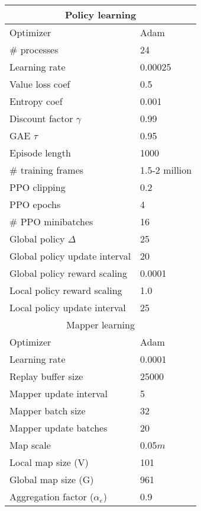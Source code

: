 \documentclass[runningheads]{llncs}
\begin{document}
\begin{table}[ht!]
\centering
\begin{tabular}{@{}ll@{}}
\toprule
\multicolumn{2}{c}{Policy learning}                             \\ \midrule
Optimizer                          & Adam~\cite{kingma2014adam} \\
$\#$ processes                     & 24                         \\
Learning rate                      & 0.00025                    \\
Value loss coef                    & 0.5                        \\
Entropy coef                       & 0.001                      \\
Discount factor $\gamma$           & 0.99                       \\
GAE $\tau$                         & 0.95                       \\
Episode length                     & 1000                       \\
$\#$ training frames               & 1.5-2 million              \\
PPO clipping                       & 0.2                        \\
PPO epochs                         & 4                          \\
$\#$ PPO minibatches               & 16                         \\
Global policy $\Delta$             & 25                         \\
Global policy update interval      & 20                         \\
Global policy reward scaling       & 0.0001                     \\
Local  policy reward scaling       & 1.0                        \\
Local policy update interval       & 25                         \\
\midrule
\multicolumn{2}{c}{Mapper learning}                             \\ \midrule
Optimizer                          & Adam~\cite{kingma2014adam} \\
Learning rate                      & 0.0001                     \\
Replay buffer size                 & 25000                      \\
Mapper update interval             & 5                          \\
Mapper batch size                  & 32                         \\
Mapper update batches              & 20                         \\
Map scale                          & 0.05$\si{m}$               \\
Local map size (V)                 & 101                        \\
Global map size (G)                & 961                        \\
Aggregation factor ($\alpha_{e}$)  & 0.9                        \\


\end{tabular}
\end{table}
\end{document}
